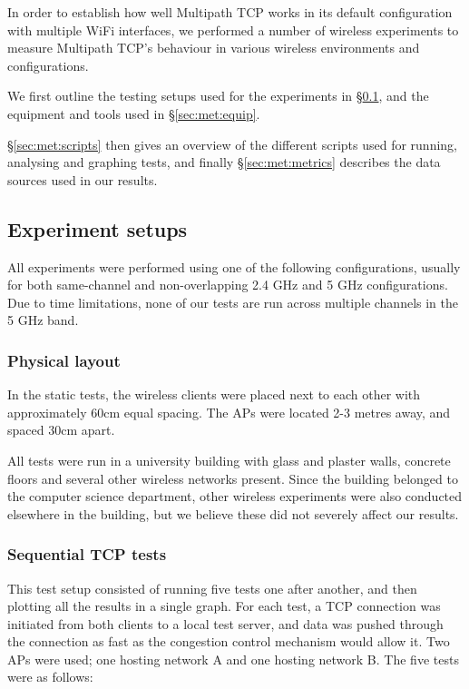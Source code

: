 In order to establish how well Multipath TCP works in its default configuration
with multiple WiFi interfaces, we performed a number of wireless experiments to
measure Multipath TCP's behaviour in various wireless environments and
configurations.

We first outline the testing setups used for the experiments in
\S\ref{sec:met:setups}, and the equipment and tools used in
\S\ref{sec:met:equip}.

\S\ref{sec:met:scripts} then gives an overview of the different scripts used for
running, analysing and graphing tests, and finally \S\ref{sec:met:metrics}
describes the data sources used in our results.

\subsection{Experiment setups}
\label{sec:met:setups}
All experiments were performed using one of the following configurations,
usually for both same-channel and non-overlapping 2.4 GHz and 5 GHz
configurations. Due to time limitations, none of our tests are run across
multiple channels in the 5 GHz band.

\subsubsection{Physical layout}
In the static tests, the wireless clients were placed next to each other with
approximately 60cm equal spacing. The APs were located 2-3 metres away, and
spaced 30cm apart.

All tests were run in a university building with glass and plaster walls,
concrete floors and several other wireless networks present. Since the building
belonged to the computer science department, other wireless experiments were
also conducted elsewhere in the building, but we believe these did not severely
affect our results.

\subsubsection{Sequential TCP tests}
\label{sec:met:setups:seqtcp}
This test setup consisted of running five tests one after another, and then
plotting all the results in a single graph. For each test, a TCP connection was
initiated from both clients to a local test server, and data was pushed through
the connection as fast as the congestion control mechanism would allow it. Two
APs were used; one hosting network A and one hosting network B. The five tests
were as follows:

